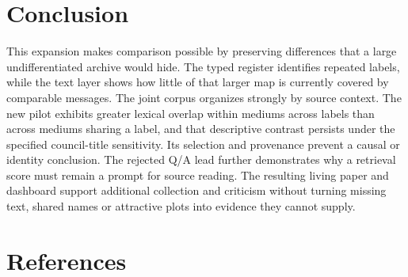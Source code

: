 \documentclass[
  11pt,
]{article}
\begin{document}
\FloatBarrier

\section{Conclusion}\label{conclusion}

This expansion makes comparison possible by preserving differences that
a large undifferentiated archive would hide. The typed register
identifies repeated labels, while the text layer shows how little of
that larger map is currently covered by comparable messages. The joint
corpus organizes strongly by source context. The new pilot exhibits
greater lexical overlap within mediums across labels than across mediums
sharing a label, and that descriptive contrast persists under the
specified council-title sensitivity. Its selection and provenance
prevent a causal or identity conclusion. The rejected Q/A lead further
demonstrates why a retrieval score must remain a prompt for source
reading. The resulting living paper and dashboard support additional
collection and criticism without turning missing text, shared names or
attractive plots into evidence they cannot supply.

\clearpage

\section{References}\label{references}
\end{document}
